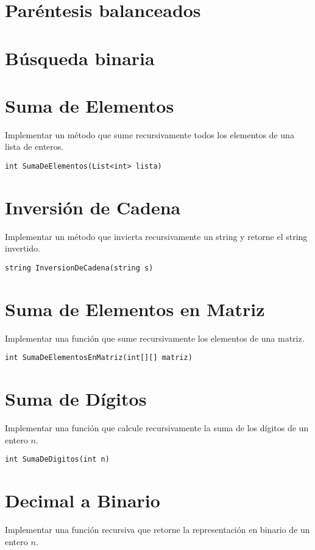 \section{Paréntesis balanceados}


\section{Búsqueda binaria}


\section{Suma de Elementos}
Implementar un método que sume recursivamente todos los elementos de una lista de enteros.

\begin{verbatim}
int SumaDeElementos(List<int> lista)
\end{verbatim}

\section{Inversión de Cadena}
Implementar un método que invierta recursivamente un string y retorne el string invertido.

\begin{verbatim}
string InversionDeCadena(string s)
\end{verbatim}

\section{Suma de Elementos en Matriz}
Implementar una función que sume recursivamente los elementos de una matriz.

\begin{verbatim}
int SumaDeElementosEnMatriz(int[][] matriz)
\end{verbatim}

\section{Suma de Dígitos}
Implementar una función que calcule recursivamente la suma de los dígitos de un entero \( n \).

\begin{verbatim}
int SumaDeDigitos(int n)
\end{verbatim}

\section{Decimal a Binario}
Implementar una función recursiva que retorne la representación en binario de un entero \( n \).

